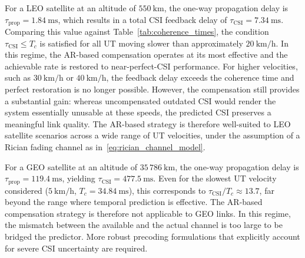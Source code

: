 For a \ac{LEO} satellite at an altitude of $550~\mathrm{km}$, the one-way propagation delay is $\tau_{\mathrm{prop}} = 1.84~\mathrm{ms}$, which results in a total \ac{CSI} feedback delay of $\tau_{\mathrm{CSI}} = 7.34~\mathrm{ms}$.
Comparing this value against Table~\ref{tab:coherence_times}, the condition $\tau_{\mathrm{CSI}} \leq T_c$ is satisfied for all \ac{UT} moving slower than approximately $20~\mathrm{km/h}$.
In this regime, the \ac{AR}-based compensation operates at its most effective and the achievable rate is restored to near-perfect-\ac{CSI} performance.
For higher velocities, such as $30~\mathrm{km/h}$ or $40~\mathrm{km/h}$, the feedback delay exceeds the coherence time and perfect restoration is no longer possible.
However, the compensation still provides a substantial gain: whereas uncompensated outdated \ac{CSI} would render the system essentially unusable at these speeds, the predicted \ac{CSI} preserves a meaningful link quality.
The \ac{AR}-based strategy is therefore well-suited to \ac{LEO} satellite scenarios across a wide range of \ac{UT} velocities, under the assumption of a Rician fading channel as in~\ref{eq:rician_channel_model}.

For a \ac{GEO} satellite at an altitude of $35\,786~\mathrm{km}$, the one-way propagation delay is $\tau_{\mathrm{prop}} = 119.4~\mathrm{ms}$, yielding $\tau_{\mathrm{CSI}} = 477.5~\mathrm{ms}$.
Even for the slowest \ac{UT} velocity considered ($5~\mathrm{km/h}$, $T_c = 34.84~\mathrm{ms}$), this corresponds to $\tau_{\mathrm{CSI}} / T_c \approx 13.7$, far beyond the range where temporal prediction is effective.
The \ac{AR}-based compensation strategy is therefore not applicable to \ac{GEO} links.
In this regime, the mismatch between the available and the actual channel is too large to be bridged the predictor.
More robust precoding formulations that explicitly account for severe \ac{CSI} uncertainty are required.
